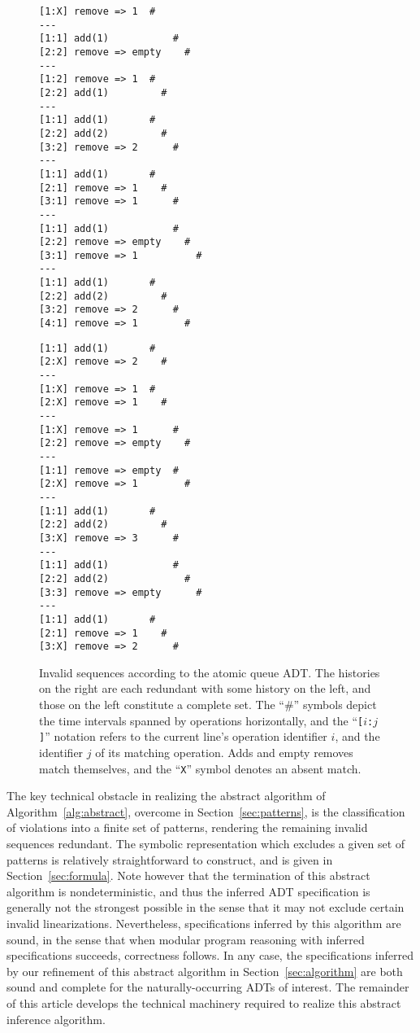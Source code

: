 \begin{figure}[t]
  \begin{minipage}[b]{0.49\linewidth}
    \begin{verbatim}
[1:X] remove => 1  #
---
[1:1] add(1)           #
[2:2] remove => empty    #
---
[1:2] remove => 1  #
[2:2] add(1)         #
---
[1:1] add(1)       #
[2:2] add(2)         #
[3:2] remove => 2      #
---
[1:1] add(1)       #
[2:1] remove => 1    #
[3:1] remove => 1      #
---
[1:1] add(1)           #
[2:2] remove => empty    #
[3:1] remove => 1          #
---
[1:1] add(1)       #
[2:2] add(2)         #
[3:2] remove => 2      #
[4:1] remove => 1        #
    \end{verbatim}
  \end{minipage}
  \hfill
  \begin{minipage}[b]{0.49\linewidth}
    \begin{verbatim}
[1:1] add(1)       #
[2:X] remove => 2    #
---
[1:X] remove => 1  #
[2:X] remove => 1    #
---
[1:X] remove => 1      #
[2:2] remove => empty    #
---
[1:1] remove => empty  #
[2:X] remove => 1        #
---
[1:1] add(1)       #
[2:2] add(2)         #
[3:X] remove => 3      #
---
[1:1] add(1)           #
[2:2] add(2)             #
[3:3] remove => empty      #
---
[1:1] add(1)       #
[2:1] remove => 1    #
[3:X] remove => 2      #
    \end{verbatim}
  \end{minipage}
  \caption{Invalid sequences according to the atomic queue ADT. The histories
  on the right are each redundant with some history on the left, and those on
  the left constitute a complete set. The “\#” symbols depict the time intervals
  spanned by operations horizontally, and the “{\tt [$i$:$j$]}” notation refers
  to the current line’s operation identifier $i$, and the identifier $j$ of
  its matching operation. Adds and empty removes match themselves, and the
  “{\tt X}” symbol denotes an absent match.}
  \label{fig:patterns}
\end{figure}

The key technical obstacle in realizing the abstract algorithm of
Algorithm~\ref{alg:abstract}, overcome in Section~\ref{sec:patterns}, is the
classification of violations into a finite set of patterns, rendering the
remaining invalid sequences redundant. The symbolic representation which
excludes a given set of patterns is relatively straightforward to construct, and
is given in Section~\ref{sec:formula}. Note however that the termination of this
abstract algorithm is nondeterministic, and thus the inferred ADT specification
is generally not the strongest possible in the sense that it may not exclude
certain invalid linearizations. Nevertheless, specifications inferred by this
algorithm are sound, in the sense that when modular program reasoning with
inferred specifications succeeds, correctness follows. In any case, the
specifications inferred by our refinement of this abstract algorithm in
Section~\ref{sec:algorithm} are both sound and complete for the
naturally-occurring ADTs of interest. The remainder of this article develops
the technical machinery required to realize this abstract inference algorithm.
